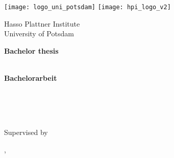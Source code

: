 \begin{titlepage}

\centering

\texttt{[image: logo\_uni\_potsdam]}
\hspace{2.5cm}
\texttt{[image: hpi\_logo\_v2]}
\vspace*{0.75cm}

\Large 
Hasso Plattner Institute\\
University of Potsdam

\vspace{1.5cm}

\Large
\textbf{Bachelor thesis}\\[0.5\baselineskip]
\LARGE
\textbf{\docTitle}\\[0.5\baselineskip]

\vspace{1.5cm}

\Large
\textbf{Bachelorarbeit}\\[0.5\baselineskip]
\LARGE
\textbf{\docTitleDE}\\[0.5\baselineskip]

\vspace{1.5cm}

\Large
\docAuthor\\
{\normalsize \docAuthorMail}\\

\vfill

\large
Supervised by \docSupervisited\\
\docChair

\vspace{1cm}
\docCity{}, \docDate\\ %
\end{titlepage}
